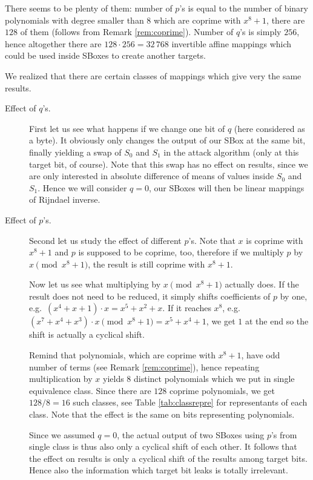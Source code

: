 There seems to be plenty of them: number of $p$'s is equal to the number of binary polynomials with degree smaller than $8$ which are coprime with $x^8+1$, there are $128$ of them (follows from Remark \ref{rem:coprime}). Number of $q$'s is simply $256$, hence altogether there are $128\cdot 256 = 32\,768$ invertible affine mappings which could be used inside SBoxes to create another targets.

\newpage   %

\begin{remark}
\label{rem:pqeffect}
	We realized that there are certain classes of mappings which give very the same results.
	\begin{description}
		\item[Effect of $q$'s.]
			First let us see what happens if we change one bit of $q$ (here considered as a byte). It obviously only changes the output of our SBox at the same bit, finally yielding a swap of $S_0$ and $S_1$ in the attack algorithm (only at this target bit, of course). Note that this swap has no effect on results, since we are only interested in absolute difference of means of values inside $S_0$ and $S_1$. Hence we will consider $q = 0$, our SBoxes will then be linear mappings of Rijndael inverse.
		
		\item[Effect of $p$'s.]
			Second let us study the effect of different $p$'s. Note that $x$ is coprime with $x^8+1$ and $p$ is supposed to be coprime, too, therefore if we multiply $p$ by $x\pmod{x^8+1}$, the result is still coprime with $x^8+1$.
			
			Now let us see what multiplying by $x\pmod{x^8+1}$ actually does. If the result does not need to be reduced, it simply shifts coefficients of $p$ by one, e.g.\ $(x^4 + x + 1) \cdot x = x^5 + x^2 + x$. If it reaches $x^8$, e.g.\ $(x^7 + x^4 + x^3) \cdot x \pmod{x^8+1} = x^5 + x^4 + 1$, we get $1$ at the end so the shift is actually a cyclical shift.
			
			Remind that polynomials, which are coprime with $x^8+1$, have odd number of terms (see Remark \ref{rem:coprime}), hence repeating multiplication by $x$ yields $8$ distinct polynomials which we put in single equivalence class. Since there are $128$ coprime polynomials, we get $128/8=16$ such classes, see Table \ref{tab:classrepre} for representants of each class. Note that the effect is the same on bits representing polynomials.
			
			Since we assumed $q = 0$, the actual output of two SBoxes using $p$'s from single class is thus also only a cyclical shift of each other. It follows that the effect on results is only a cyclical shift of the results among target bits. Hence also the information which target bit leaks is totally irrelevant.
	\end{description}
\end{remark}


